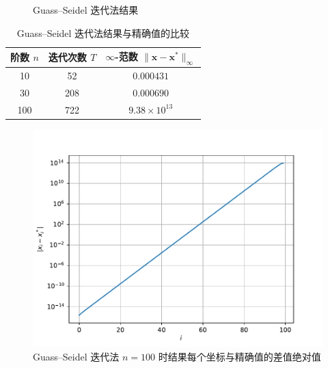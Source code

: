 \documentclass{sjtuarticle}
\begin{document}
\begin{minipage}{0.5\textwidth}
    \begin{figure}[H]
        \centering
        \inputminted[firstline=133,lastline=170,fontsize=\tiny]{text}{stdout.txt}
        \caption{Guass--Seidel 迭代法结果}
    \end{figure}
\end{minipage}
\begin{minipage}{0.45\textwidth}
    \begin{table}[H]
        \centering
        \caption{Guass--Seidel 迭代法结果与精确值的比较}
        \begin{tabular}{ccc}
            \toprule
            阶数 $n$ & 迭代次数 $T$ & $\infty$-范数 $\lVert \bm{x}-\bm{x}^* \rVert_\infty$ \\
            \midrule
            10 & 52   & $0.000431$          \\
            30 & 208  & $0.000690$          \\
            100 & 722 & $9.38\times 10^{13}$\\
            \bottomrule
        \end{tabular}
    \end{table}
    \vspace*{-0.75cm}
    \begin{figure}[H]
        \centering
        \includegraphics[width=\textwidth]{pic/GuassSeidelSolver.pdf}
        \caption{Guass--Seidel 迭代法 $n=100$ 时结果每个坐标与精确值的差值绝对值}
    \end{figure}
\end{minipage}
\end{document}
